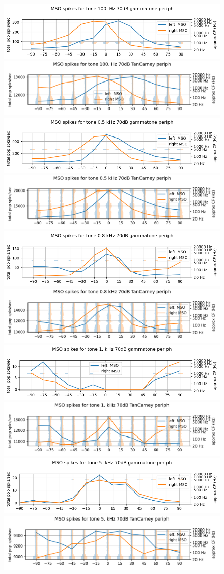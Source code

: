 \documentclass[11pt,a4paper,twocolumn]{article}
\begin{document}
\begin{figure}
    \centering
    \includegraphics[width=0.4\linewidth]{Images/gamm100.png}
    \includegraphics[width=0.4\linewidth]{Images/mtc100.png}
    \includegraphics[width=0.4\linewidth]{Images/gamm500.png}
    \includegraphics[width=0.4\linewidth]{Images/mtc500.png}
    \includegraphics[width=0.4\linewidth]{Images/gamm800.png}
    \includegraphics[width=0.4\linewidth]{Images/mtc800.png}
    \includegraphics[width=0.4\linewidth]{Images/gamm1000.png}
    \includegraphics[width=0.4\linewidth]{Images/mtc1000.png}
    \includegraphics[width=0.4\linewidth]{Images/gamm5000.png}
    \includegraphics[width=0.4\linewidth]{Images/mtc5000.png}

\end{figure}
\end{document}
